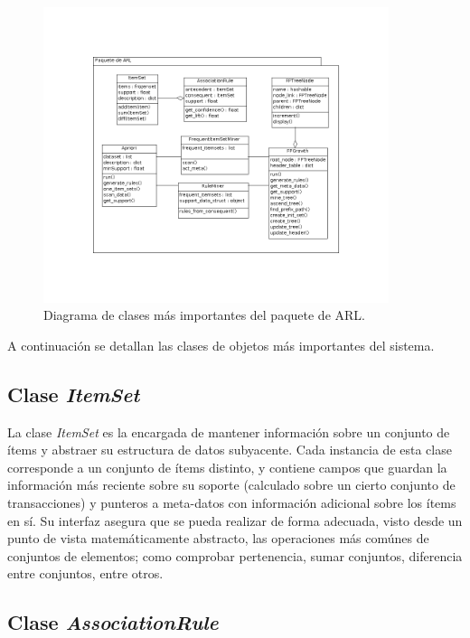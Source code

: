 \begin{figure}[h!]
\begin{center}
\includegraphics[width=0.9\textwidth]{imagenes/arl_diag_clases.png}
\end{center}
\vspace*{-5mm}
\caption{Diagrama de clases más importantes del paquete de ARL.}
\label{fig:arl_diag_clases}
\end{figure}

A continuación se detallan las clases de objetos más importantes del sistema.

\subsection{Clase \textit{ItemSet}}

La clase \textit{ItemSet} es la encargada de mantener información sobre un conjunto de ítems y abstraer su estructura de datos subyacente. Cada instancia de esta clase corresponde a un conjunto de ítems distinto, y contiene campos que guardan la información más reciente sobre su soporte (calculado sobre un cierto conjunto de transacciones) y punteros a meta-datos con información adicional sobre los ítems en sí. Su interfaz asegura que se pueda realizar de forma adecuada, visto desde un punto de vista matemáticamente abstracto, las operaciones más comúnes de conjuntos de elementos; como comprobar pertenencia, sumar conjuntos, diferencia entre conjuntos, entre otros.

\subsection{Clase \textit{AssociationRule}}

